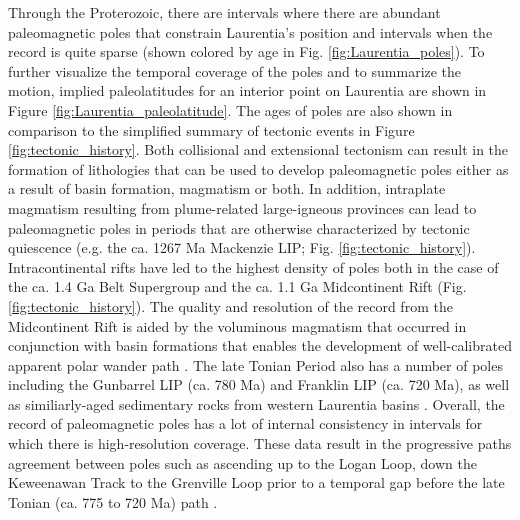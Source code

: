 \documentclass[11pt,letterpaper]{article}
\begin{document}
Through the Proterozoic, there are intervals where there are abundant paleomagnetic poles that constrain Laurentia's position and intervals when the record is quite sparse (shown colored by age in Fig. \ref{fig:Laurentia_poles}). To further visualize the temporal coverage of the poles and to summarize the motion, implied paleolatitudes for an interior point on Laurentia are shown in Figure \ref{fig:Laurentia_paleolatitude}. The ages of poles are also shown in comparison to the simplified summary of tectonic events in Figure \ref{fig:tectonic_history}. Both collisional and extensional tectonism can result in the formation of lithologies that can be used to develop paleomagnetic poles either as a result of basin formation, magmatism or both. In addition, intraplate magmatism resulting from plume-related large-igneous provinces can lead to paleomagnetic poles in periods that are otherwise characterized by tectonic quiescence (e.g. the ca. 1267 Ma Mackenzie LIP; Fig. \ref{fig:tectonic_history}). Intracontinental rifts have led to the highest density of poles both in the case of the ca. 1.4 Ga Belt Supergroup and the ca. 1.1 Ga Midcontinent Rift (Fig. \ref{fig:tectonic_history}). The quality and resolution of the record from the Midcontinent Rift is aided by the voluminous magmatism that occurred in conjunction with basin formations that enables the development of well-calibrated apparent polar wander path \citep{Swanson-Hysell2019a}. The late Tonian Period also has a number of poles including the Gunbarrel LIP (ca. 780 Ma) and Franklin LIP (ca. 720 Ma), as well as similiarly-aged sedimentary rocks from western Laurentia basins \citep{Eyster2019a}. Overall, the record of paleomagnetic poles has a lot of internal consistency in intervals for which there is high-resolution coverage. These data result in the progressive paths agreement between poles such as ascending up to the Logan Loop, down the Keweenawan Track \citep{Swanson-Hysell2019a} to the Grenville Loop prior to a temporal gap before the late Tonian (ca. 775 to 720 Ma) path \citep{Eyster2019a}. 
\end{document}
